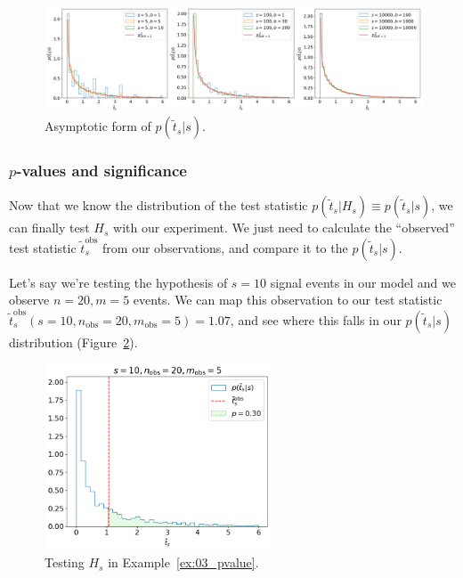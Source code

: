 \begin{figure}[htb]
\centering
\includegraphics[width=\textwidth]{figures/03-Stats/02-hypothesis-testing/2.png}
\captionsetup{justification=centering}
\caption{Asymptotic form of $p(\tilde{t}_s|s)$.}
\label{fig:03_p_tilde_t_asym}
\end{figure}

\subsubsection{\texorpdfstring{$p$-values}{p-values} and significance}
\label{sec:03_significance}

Now that we know the distribution of the test statistic $p(\tilde{t}_s|H_s) \equiv p(\tilde{t}_s|s)$, we can finally test $H_s$ with our experiment.
We just need to calculate the ``observed'' test statistic $\tilde{t}^{\mathrm{obs}}_s$ from our observations, and compare it to the $p(\tilde{t}_s|s)$.

\begin{example}
\label{ex:03_pvalue}
Let's say we're testing the hypothesis of $s = 10$ signal events in our model and we observe $n = 20, m = 5$ events.
We can map this observation to our test statistic $\tilde{{t}}^{\mathrm{{obs}}}_s(s = 10, n_{\mathrm{obs}} = 20, m_{\mathrm{obs}} = 5) = 1.07$,
and see where this falls in our $p(\tilde{t}_s|s)$ distribution (Figure~\ref{fig:03_Hs}).
\end{example}

\begin{figure}[htb]
\centering
\includegraphics[width=0.6\textwidth]{figures/03-Stats/02-hypothesis-testing/3.png}
\captionsetup{justification=centering}
\caption{Testing $H_s$ in Example~\ref{ex:03_pvalue}.}
\label{fig:03_Hs}
\end{figure}

